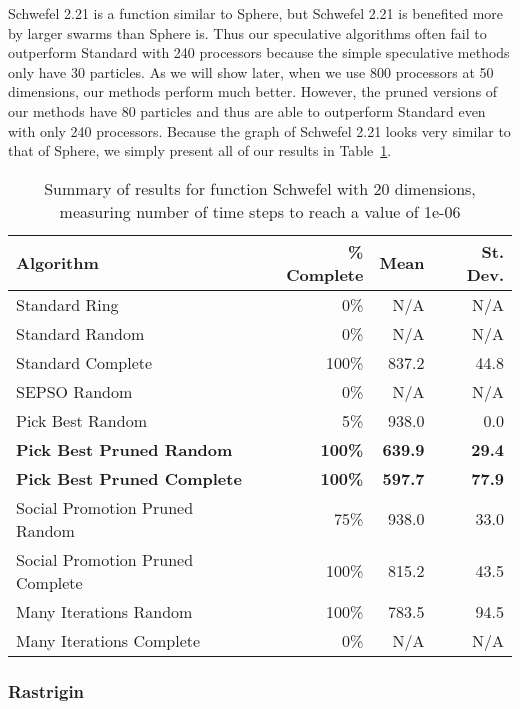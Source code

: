 \documentclass[smallcondensed]{svjour3}
\newcommand{\tabref}[1]{Table~\ref{tab:#1}}
\begin{document}
Schwefel 2.21 is a function similar to Sphere, but Schwefel 2.21 is benefited
more by larger swarms than Sphere is.  Thus our speculative algorithms often
fail to outperform Standard with 240 processors because the simple speculative
methods only have 30 particles.  As we will show later, when we use 800
processors at 50 dimensions, our methods perform much better.  However, the
pruned versions of our methods have 80 particles and thus are able to
outperform Standard even with only 240 processors.  Because the graph of
Schwefel 2.21 looks very similar to that of Sphere, we simply present all of
our results in \tabref{schwefel-20}.

\begin{table}
  \caption{Summary of results for function Schwefel with 20 dimensions,
  measuring number of time steps to reach a value of 1e-06}
  \label{tab:schwefel-20}
  \centering
  \begin{tabular}{|l|r|r|r|}
  \hline
  Algorithm&\% Complete&Mean&St. Dev.\\
  \hline
  \hline
  Standard Ring&0\%&N/A&N/A\\
  \hline
  Standard Random&0\%&N/A&N/A\\
  \hline
  Standard Complete&100\%&837.2&44.8\\
  \hline
  SEPSO Random&0\%&N/A&N/A\\
  \hline
  Pick Best Random&5\%&938.0&0.0\\
  \hline
  \textbf{Pick Best Pruned Random}&\textbf{100\%}&\textbf{639.9}&\textbf{29.4}\\
  \hline
  \textbf{Pick Best Pruned Complete}&\textbf{100\%}&\textbf{597.7}&
	\textbf{77.9}\\
  \hline
  Social Promotion Pruned Random&75\%&938.0&33.0\\
  \hline
  Social Promotion Pruned Complete&100\%&815.2&43.5\\
  \hline
  Many Iterations Random&100\%&783.5&94.5\\
  \hline
  Many Iterations Complete&0\%&N/A&N/A\\
  \hline
  \end{tabular}
\end{table}


\subsubsection{Rastrigin}
\end{document}
